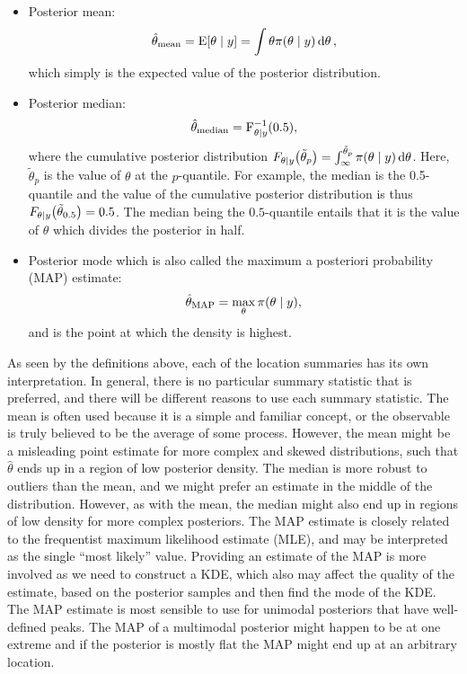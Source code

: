 \begin{itemize}
    \item Posterior mean: 
    \begin{equation}\label{eq:posterior_mean}
        \hat{\theta}_\mathrm{mean} = \mathrm{E} \qty[\theta \mid y] = \int \theta \pi \qty(\theta \mid y) \dd{\theta}, 
    \end{equation}
    which simply is the expected value of the posterior distribution. 
    \item Posterior median: 
    \begin{equation}\label{eq:posterior_median}
        \hat{\theta}_\mathrm{median} = \mathrm{F}_{\theta \mid y}^{-1} \qty(0.5),
    \end{equation}
    where the cumulative posterior distribution $F_{\theta \mid y} \qty(\tilde{\theta}_p) = \int_{\infty}^{\tilde{\theta}_p} \pi \qty(\theta \mid y) \dd{\theta}$. Here, $\tilde{\theta}_p$ is the value of $\theta$ at the $p$-quantile. For example, the median is the 0.5-quantile and the value of the cumulative posterior distribution is thus $F_{\theta \mid y} \qty(\tilde{\theta}_{0.5}) = 0.5$. The median being the $0.5$-quantile entails that it is the value of $\theta$ which divides the posterior in half.
    \item Posterior mode which is also called the maximum a posteriori probability (MAP) estimate: 
    \begin{equation}\label{eq:posterior_map}
        \hat{\theta}_\mathrm{MAP} = \max_\theta \pi \qty(\theta \mid y),
    \end{equation}
    and is the point at which the density is highest. 
\end{itemize}

As seen by the definitions above, each of the location summaries has its own interpretation. In general, there is no particular summary statistic that is preferred, and there will be different reasons to use each summary statistic. The mean is often used because it is a simple and familiar concept, or the observable is truly believed to be the average of some process. However, the mean might be a misleading point estimate for more complex and skewed distributions, such that $\hat{\theta}$ ends up in a region of low posterior density. The median is more robust to outliers than the mean, and we might prefer an estimate in the middle of the distribution. However, as with the mean, the median might also end up in regions of low density for more complex posteriors. The MAP estimate is closely related to the frequentist maximum likelihood estimate (MLE), and may be interpreted as the single “most likely” value. Providing an estimate of the MAP is more involved as we need to construct a KDE, which also may affect the quality of the estimate, based on the posterior samples and then find the mode of the KDE. The MAP estimate is most sensible to use for unimodal posteriors that have well-defined peaks. The MAP of a multimodal posterior might happen to be at one extreme and if the posterior is mostly flat the MAP might end up at an arbitrary location.  



